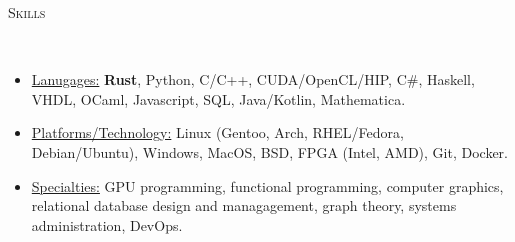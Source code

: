 \documentclass[9pt]{article}
\newenvironment{changemargin}[2]{%
  \begin{list}{}{%
    \setlength{\topsep}{0pt}%
    \setlength{\leftmargin}{#1}%
    \setlength{\rightmargin}{#2}%
    \setlength{\listparindent}{\parindent}%
    \setlength{\itemindent}{\parindent}%
    \setlength{\parsep}{\parskip}%
  }%
  \item[]}{\end{list}
}
\newcommand{\lineover}{
	\begin{changemargin}{-0.05in}{-0.05in}
		\vspace*{-8pt}
		\hrulefill \\
		\vspace*{-2pt}
	\end{changemargin}
}
\newcommand{\header}[1]{
	\begin{changemargin}{-0.5in}{-0.5in}
		\scshape{#1}\\
  	\lineover
	\end{changemargin}
}
\newenvironment{body} {
	\vspace*{-16pt}
	\begin{changemargin}{-0.25in}{-0.5in}
  }	
	{\end{changemargin}
}
\begin{document}
\header{Skills}
\smallskip
\begin{body}
	\vspace{14pt}
	\begin{itemize} \itemsep -0pt

		\item \uline{Lanugages:} \textbf{Rust}, Python, C/C++, CUDA/OpenCL/HIP, C\#, Haskell, VHDL, OCaml, Javascript, SQL, Java/Kotlin, Mathematica.

		\item \uline{Platforms/Technology:} Linux (Gentoo, Arch, RHEL/Fedora,
		Debian/Ubuntu), Windows, MacOS,
		      BSD, FPGA (Intel, AMD), Git, Docker.
		\item \uline{Specialties:} GPU programming, functional programming, computer graphics, relational database design and managagement, graph theory, systems administration, DevOps.
	\end{itemize}
\end{body}
\end{document}
